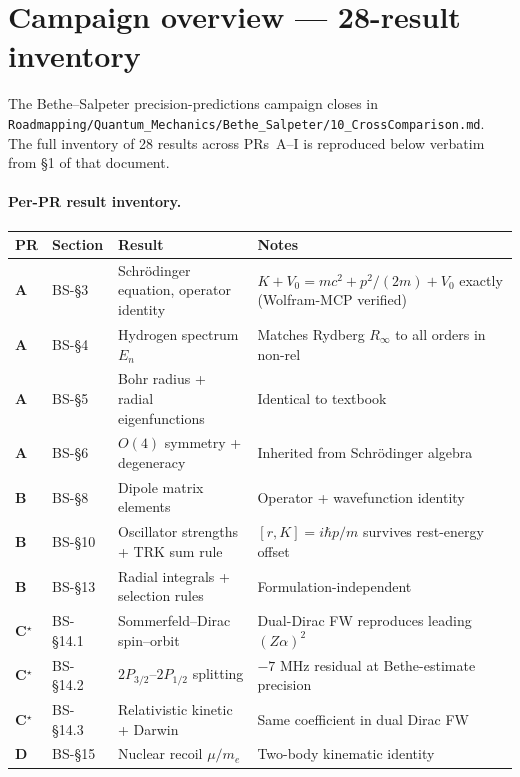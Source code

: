 \section{Campaign overview --- 28-result inventory}
\label{sec:campaign-overview}

The Bethe--Salpeter precision-predictions campaign closes in
\texttt{Roadmapping/Quantum\_Mechanics/Bethe\_Salpeter/10\_CrossComparison.md}.
The full inventory of 28 results across PRs~A--I is reproduced below
verbatim from \S1 of that document.

\paragraph{Per-PR result inventory.}
\begin{center}
\renewcommand{\arraystretch}{1.0}
\small
\begin{longtable}{lllp{5.5cm}}
\toprule
PR & Section & Result & Notes \\
\midrule \endhead
\textbf{A} & BS-\S 3   & Schr\"odinger equation, operator identity & $K + V_0 = mc^2 + p^2/(2m) + V_0$ exactly (Wolfram-MCP verified) \\
\textbf{A} & BS-\S 4   & Hydrogen spectrum $E_n$                   & Matches Rydberg $R_\infty$ to all orders in non-rel \\
\textbf{A} & BS-\S 5   & Bohr radius + radial eigenfunctions        & Identical to textbook \\
\textbf{A} & BS-\S 6   & $O(4)$ symmetry + degeneracy               & Inherited from Schr\"odinger algebra \\
\textbf{B} & BS-\S 8   & Dipole matrix elements                     & Operator + wavefunction identity \\
\textbf{B} & BS-\S 10  & Oscillator strengths + TRK sum rule        & $[r, K] = i\hbar p/m$ survives rest-energy offset \\
\textbf{B} & BS-\S 13  & Radial integrals + selection rules         & Formulation-independent \\
\textbf{C}$^\star$ & BS-\S 14.1 & Sommerfeld--Dirac spin--orbit     & Dual-Dirac FW reproduces leading $(Z\alpha)^2$ \\
\textbf{C}$^\star$ & BS-\S 14.2 & $2P_{3/2}$--$2P_{1/2}$ splitting  & ${-}7$ MHz residual at Bethe-estimate precision \\
\textbf{C}$^\star$ & BS-\S 14.3 & Relativistic kinetic + Darwin     & Same coefficient in dual Dirac FW \\
\textbf{D} & BS-\S 15  & Nuclear recoil $\mu/m_e$                   & Two-body kinematic identity \\

\end{longtable}
\end{center}
